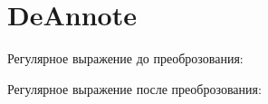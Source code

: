 \section{DeAnnote}
\begin{frame}{}
	Регулярное выражение до преоброзования:


	Регулярное выражение после преоброзования:

\end{frame}
